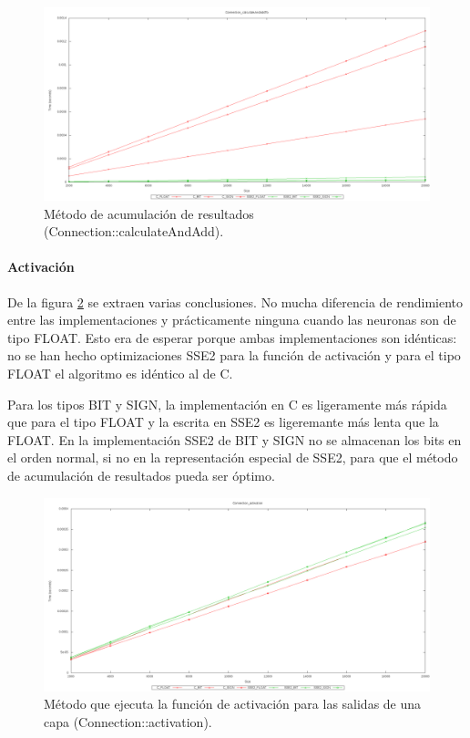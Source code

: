 \documentclass[11pt]{article}
\begin{document}
\begin{titlepage}
\begin{figure}[htb]
\centering
\includegraphics[width=\textwidth]{./img/Connection_calculateAndAddTo.png}
\caption{\label{grafImplCalculate}Método de acumulación de resultados (Connection::calculateAndAdd).}
\end{figure}
\newpage
\paragraph{Activación}
\label{sec-6-1-1-2}


De la figura \ref{grafImplActivation} se extraen varias conclusiones. No mucha diferencia de rendimiento entre las implementaciones y prácticamente ninguna cuando las neuronas son de tipo FLOAT. Esto era de esperar porque ambas implementaciones son idénticas: no se han hecho optimizaciones SSE2 para la función de activación y para el tipo FLOAT el algoritmo es idéntico al de C.

Para los tipos BIT y SIGN, la implementación en C es ligeramente más rápida que para el tipo FLOAT y la  escrita en SSE2 es ligeremante más lenta que la FLOAT. En la implementación SSE2 de BIT y SIGN no se almacenan los bits en el orden normal, si no en la representación especial de SSE2, para que el método de acumulación de resultados pueda ser óptimo.

\begin{figure}[htb]
\centering
\includegraphics[width=\textwidth]{./img/Connection_activation.png}
\caption{\label{grafImplActivation}Método que ejecuta la función de activación para las salidas de una capa (Connection::activation).}
\end{figure}
\newpage

\end{titlepage}
\end{document}
